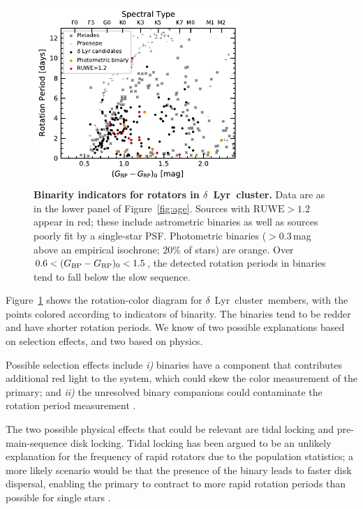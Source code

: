 \documentclass[12pt,modern,twocolumn,tighten]{aastex63}
\newcommand{\cn}{$\delta$\ Lyr\ cluster} %
\newcommand{\bpmrpo}{(G_{\rm BP}-G_{\rm RP})_0}
\begin{document}
\begin{figure}[t]
	\begin{center}
		\leavevmode
		\includegraphics[width=0.7\textwidth]{f15supp.pdf}
	\end{center}
	\vspace{-0.7cm}
  \caption{ {\bf Binarity indicators for rotators in \cn.} 
    Data are as in the lower panel of Figure~\ref{fig:age}.  Sources
    with $\mathrm{RUWE}>1.2$ appear in red; these include astrometric binaries as well
    as sources poorly fit by a single-star PSF.  Photometric binaries
    ($>$0.3\,mag above an empirical isochrone; 20\% of stars) are
    orange.  Over $0.6<\bpmrpo<1.5$, the detected rotation periods in
    binaries tend to fall below the slow sequence.
		\label{fig:binarity}
	}
\end{figure}

Figure~\ref{fig:binarity} shows the rotation-color diagram for \cn\
members, with the points colored according to indicators of binarity.
The binaries tend to be redder and have shorter rotation periods.  We
know of two possible explanations based on selection effects, and two
based on physics.

Possible selection effects include {\it i)} binaries have a component
that contributes additional red light to the system, which could skew
the color measurement of the primary; and {\it ii)} the unresolved
binary companions could contaminate the rotation period measurement
\citep[{\it e.g.},][Section~5.1]{stauffer_rotation_2016}.

The two possible physical effects that could be relevant are tidal
locking and pre-main-sequence disk locking.  Tidal locking has been
argued to be an unlikely explanation for the frequency of rapid
rotators due to the population statistics; a more likely scenario
would be that the presence of the binary leads to faster disk
dispersal, enabling the primary to contract to more rapid rotation
periods than possible for single stars
\citep{meibom_effect_2007,bouma_cluster_2020}.
\end{document}
